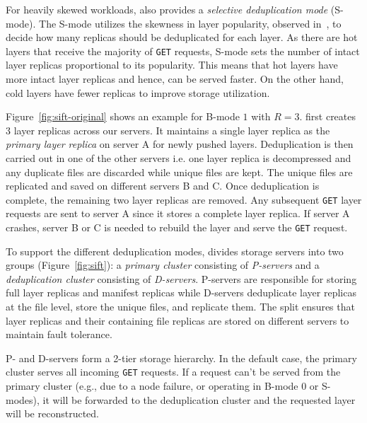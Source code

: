 For heavily skewed workloads, \sysname also provides a \emph{selective
deduplication mode} (S-mode).
%
The S-mode utilizes the skewness in layer popularity, observed
in~\cite{dockerworkload}, to decide how many replicas should be deduplicated
for each layer.
%
As there are hot layers that receive the majority of \texttt{GET} requests,
S-mode sets the number of intact layer replicas proportional to its
popularity.
%
This means that hot layers have more intact layer replicas and
hence, can be served faster.
%
On the other hand, cold layers have fewer replicas to improve storage utilization.

Figure~\ref{fig:sift-original} shows an example for B-mode $1$ with $R=3$.
\sysname first creates 3 layer replicas across our servers. It maintains a single layer replica as the \emph{primary layer replica} on
server A for newly pushed layers.
%
Deduplication is then carried out in one of the other servers i.e. one layer replica is decompressed and any duplicate
files are discarded while unique files are kept.  The unique files are replicated
and saved on different servers B and C. Once deduplication is complete, the remaining two layer replicas are removed. 
%
Any subsequent \texttt{GET} layer requests are sent to server A since it
stores a complete layer replica.
%
If server A crashes, server B or C is needed to rebuild the layer and serve the
\texttt{GET} request.

To support the different deduplication modes, \sysname divides storage servers
into two groups (Figure~\ref{fig:sift}): a \emph{primary cluster}
consisting of \emph{P-servers} and a \emph{deduplication cluster} consisting of
\emph{D-servers}.
%
P-servers are responsible for storing full layer replicas and manifest replicas
while D-servers deduplicate layer replicas at the file level, store the unique
files, and replicate them.
%
The split ensures that layer replicas and their containing file
replicas are stored on different servers to maintain fault tolerance.


P- and D-servers form a 2-tier storage hierarchy. In the default case,
the primary cluster serves all incoming \texttt{GET} requests.
%
If a request can't be served from the primary cluster (e.g., due to a
node failure, or \sysname operating in B-mode 0 or S-modes),
it will be forwarded to the deduplication cluster and the requested
layer will be reconstructed.
%
%





